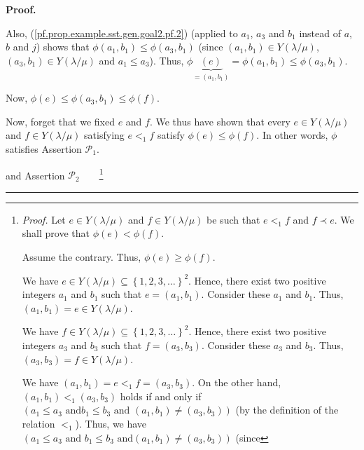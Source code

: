\documentclass[numbers=enddot,12pt,final,onecolumn,notitlepage,abstracton]{scrartcl}
\theoremstyle{definition}
\newenvironment{proof}[1][Proof]{\noindent\textbf{#1.} }{\ \rule{0.5em}{0.5em}}
\newenvironment{verlong}{}{}
\begin{document}
\begin{verlong}
\begin{footnotesize}
\begin{proof}
{Also, (\ref{pf.prop.example.sst.gen.goal2.pf.2}) (applied to $a_{1}$, $a_{3}$
and $b_{1}$ instead of $a$, $b$ and $j$) shows that $\phi\left(  a_{1}%
,b_{1}\right)  \leq\phi\left(  a_{3},b_{1}\right)  $ (since $\left(
a_{1},b_{1}\right)  \in Y\left(  \lambda/\mu\right)  $, $\left(  a_{3}%
,b_{1}\right)  \in Y\left(  \lambda/\mu\right)  $ and $a_{1}\leq a_{3}$).
Thus, $\phi\underbrace{\left(  e\right)  }_{=\left(  a_{1},b_{1}\right)
}=\phi\left(  a_{1},b_{1}\right)  \leq\phi\left(  a_{3},b_{1}\right)  $.
\par
Now, $\phi\left(  e\right)  \leq\phi\left(  a_{3},b_{1}\right)  \leq
\phi\left(  f\right)  $.
\par
Now, forget that we fixed $e$ and $f$. We thus have shown that every $e\in
Y\left(  \lambda/\mu\right)  $ and $f\in Y\left(  \lambda/\mu\right)  $
satisfying $e<_{1}f$ satisfy $\phi\left(  e\right)  \leq\phi\left(  f\right)
$. In other words, $\phi$ satisfies Assertion $\mathcal{P}_{1}$.} and
Assertion $\mathcal{P}_{2}$\ \ \ \ \footnote{\textit{Proof.} Let $e\in
Y\left(  \lambda/\mu\right)  $ and $f\in Y\left(  \lambda/\mu\right)  $ be
such that $e<_{1}f$ and $f\prec e$. We shall prove that $\phi\left(  e\right)
<\phi\left(  f\right)  $.
\par
Assume the contrary. Thus, $\phi\left(  e\right)  \geq\phi\left(  f\right)  $.
\par
We have $e\in Y\left(  \lambda/\mu\right)  \subseteq\left\{  1,2,3,\ldots
\right\}  ^{2}$. Hence, there exist two positive integers $a_{1}$ and $b_{1}$
such that $e=\left(  a_{1},b_{1}\right)  $. Consider these $a_{1}$ and $b_{1}%
$. Thus, $\left(  a_{1},b_{1}\right)  =e\in Y\left(  \lambda/\mu\right)  $.
\par
We have $f\in Y\left(  \lambda/\mu\right)  \subseteq\left\{  1,2,3,\ldots
\right\}  ^{2}$. Hence, there exist two positive integers $a_{3}$ and $b_{3}$
such that $f=\left(  a_{3},b_{3}\right)  $. Consider these $a_{3}$ and $b_{3}%
$. Thus, $\left(  a_{3},b_{3}\right)  =f\in Y\left(  \lambda/\mu\right)  $.
\par
We have $\left(  a_{1},b_{1}\right)  =e<_{1}f=\left(  a_{3},b_{3}\right)  $.
On the other hand, $\left(  a_{1},b_{1}\right)  <_{1}\left(  a_{3}%
,b_{3}\right)  $ holds if and only if $\left(  a_{1}\leq a_{3}\text{ and
}b_{1}\leq b_{3}\text{ and }\left(  a_{1},b_{1}\right)  \neq\left(
a_{3},b_{3}\right)  \right)  $ (by the definition of the relation $<_{1}$).
Thus, we have $\left(  a_{1}\leq a_{3}\text{ and }b_{1}\leq b_{3}\text{ and
}\left(  a_{1},b_{1}\right)  \neq\left(  a_{3},b_{3}\right)  \right)  $ (since
}
\end{proof}
\end{footnotesize}
\end{verlong}
\end{document}
